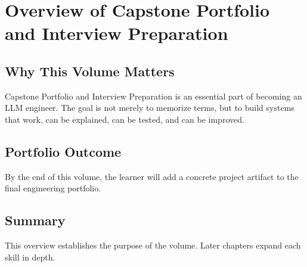 
\chapter{Overview of Capstone Portfolio and Interview Preparation}
\label{chap:volume16-overview}



\section{Why This Volume Matters}

Capstone Portfolio and Interview Preparation is an essential part of becoming an LLM engineer. The goal is not merely to memorize terms, but to build systems that work, can be explained, can be tested, and can be improved.

\section{Portfolio Outcome}

By the end of this volume, the learner will add a concrete project artifact to the final engineering portfolio.

\section{Summary}

This overview establishes the purpose of the volume. Later chapters expand each skill in depth.
